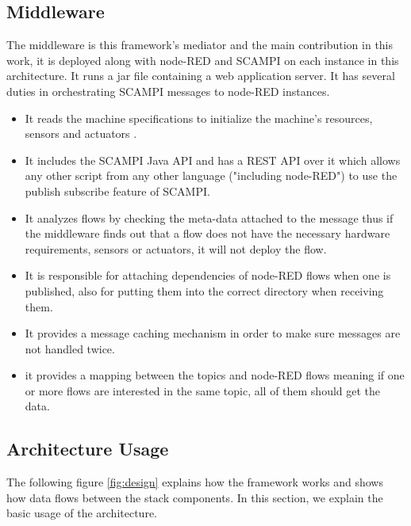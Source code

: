 \subsection{Middleware}
The middleware is this framework's mediator and the main contribution in this work, it is deployed along with node-RED and SCAMPI on each instance in this architecture. It runs a jar file containing a web application server. It has several duties in orchestrating  SCAMPI messages to node-RED instances.
\begin{itemize}
\item It reads the machine specifications to initialize the machine's resources, sensors and actuators 	.
\item It includes the SCAMPI Java API and has a REST API over it which allows any other script from any other language ("including node-RED") to use the publish subscribe feature of SCAMPI.
\item It analyzes  flows by checking the meta-data  attached to the message thus if the middleware finds out that a flow does not have the necessary hardware requirements, sensors or actuators, it will not deploy the flow. 
\item It is responsible for attaching dependencies of  node-RED flows when one is published, also for putting them into the correct directory when receiving them.
\item It provides a message caching mechanism in order to make sure messages are not handled twice.
\item it provides a mapping between the topics and node-RED flows meaning if one or more flows are interested in the same topic, all of them should get the data.
 \end{itemize}

\subsection{Architecture Usage}
The following figure \ref{fig:design} explains how the framework works and shows how data flows between the stack components. In this section, we explain the basic usage of the architecture.

